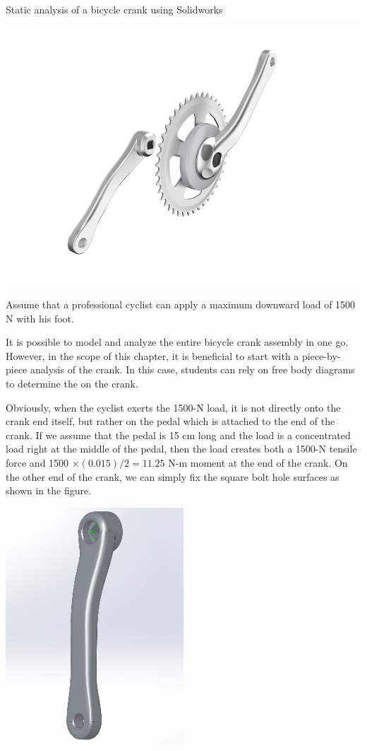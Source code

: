 \documentclass[a4paper,openany,nobib]{tufte-book}
\begin{document}
{{Static analysis of a bicycle crank using Solidworks


\begin{center}
\includegraphics[width=.9\linewidth]{pictures/Intro-CAD/bike-crank-set.jpg}
\end{center}

Assume that a professional cyclist can apply a maximum downward load of
1500 N with his foot.

It is possible to model and analyze the entire bicycle crank assembly in
one go. However, in the scope of this chapter, it is beneficial to start
with a piece-by-piece analysis of the crank. In this case, students can
rely on free body diagrams to determine the on the crank.

Obviously, when the cyclist exerts the 1500-N load, it is not directly
onto the crank end itself, but rather on the pedal which is attached to
the end of the crank. If we assume that the pedal is 15 cm long and the
load is a concentrated load right at the middle of the pedal, then the
load creates both a 1500-N tensile force and 1500
\(\times (0.015)/2 = 11.25\) N-m moment at the end of the crank. On the
other end of the crank, we can simply fix the square bolt hole surfaces
as shown in the figure.

\begin{center}
\includegraphics[width=0.5\textwidth]{pictures/Intro-CAD/Crank-before-running.png}
\end{center}

}}
\end{document}
